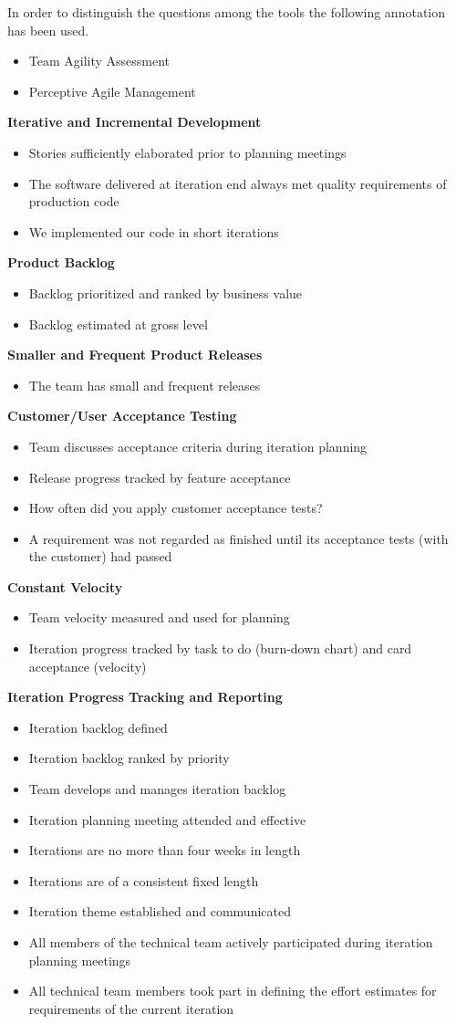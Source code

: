 \newcommand*\taa{\item[\DiamondSolid]}
\newcommand*\pam{\item[\OrnamentDiamondSolid]}

In order to distinguish the questions among the tools the following annotation has been used. 
\begin{itemize}
  \taa Team Agility Assessment 
  \pam Perceptive Agile Management
\end{itemize}

\vspace{0.5cm}

\textbf{Iterative and Incremental Development}
\begin{itemize}
	\taa Stories sufficiently elaborated prior to planning meetings
	\pam The software delivered at iteration end always met quality requirements of production code 
	\pam We implemented our code in short iterations
\end{itemize}

\textbf{Product Backlog}
\begin{itemize}
	\taa Backlog prioritized and ranked by business value
	\taa Backlog estimated at gross level
\end{itemize}

\textbf{Smaller and Frequent Product Releases}
\begin{itemize}
	\taa The team has small and frequent releases
\end{itemize}

\textbf{Customer/User Acceptance Testing}
\begin{itemize}
	\taa Team discusses acceptance criteria during iteration planning
	\taa Release progress tracked by feature acceptance
	\pam How often did you apply customer acceptance tests?
	\pam A requirement was not regarded as finished until its acceptance tests (with the customer) had passed 
\end{itemize}

\textbf{Constant Velocity}
\begin{itemize}
	\taa Team velocity measured and used for planning
	\taa Iteration progress tracked by task to do (burn-down chart) and card acceptance (velocity)
\end{itemize}

\textbf{Iteration Progress Tracking and Reporting}
\begin{itemize}
	\taa Iteration backlog defined
	\taa Iteration backlog ranked by priority
	\taa Team develops and manages iteration backlog
	\taa Iteration planning meeting attended and effective
	\taa Iterations are no more than four weeks in length
	\taa Iterations are of a consistent fixed length
	\taa Iteration theme established and communicated 
	\pam All members of the technical team actively participated during iteration planning meetings
	\pam All technical team members took part in defining the effort estimates for 
requirements of the current iteration
\end{itemize}

